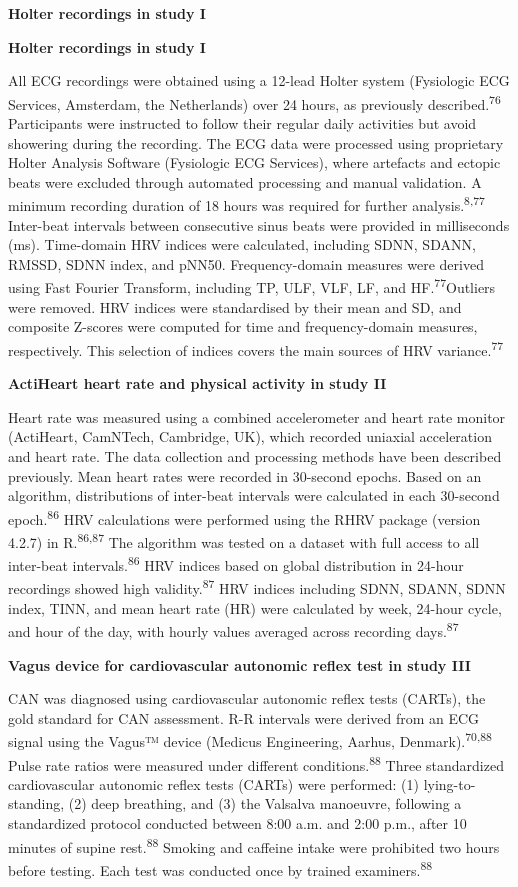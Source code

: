 \documentclass[
  letterpaper,
  headsepline=true,
  open=any]{scrbook}
\begin{document}
\textbf{Holter recordings in study I}

\textbf{Holter recordings in study I}

All ECG recordings were obtained using a 12-lead Holter system
(Fysiologic ECG Services, Amsterdam, the Netherlands) over 24 hours, as
previously described.\textsuperscript{76} Participants were instructed
to follow their regular daily activities but avoid showering during the
recording. The ECG data were processed using proprietary Holter Analysis
Software (Fysiologic ECG Services), where artefacts and ectopic beats
were excluded through automated processing and manual validation. A
minimum recording duration of 18 hours was required for further
analysis.\textsuperscript{8,77} Inter-beat intervals between consecutive
sinus beats were provided in milliseconds (ms). Time-domain HRV indices
were calculated, including SDNN, SDANN, RMSSD, SDNN index, and pNN50.
Frequency-domain measures were derived using Fast Fourier Transform,
including TP, ULF, VLF, LF, and HF.\textsuperscript{77}Outliers were
removed. HRV indices were standardised by their mean and SD, and
composite Z-scores were computed for time and frequency-domain measures,
respectively. This selection of indices covers the main sources of HRV
variance.\textsuperscript{77}

\textbf{ActiHeart heart rate and physical activity in study II}

Heart rate was measured using a combined accelerometer and heart rate
monitor (ActiHeart, CamNTech, Cambridge, UK), which recorded uniaxial
acceleration and heart rate. The data collection and processing methods
have been described previously. Mean heart rates were recorded in
30-second epochs. Based on an algorithm, distributions of inter-beat
intervals were calculated in each 30-second epoch.\textsuperscript{86}
HRV calculations were performed using the RHRV package (version 4.2.7)
in R.\textsuperscript{86,87} The algorithm was tested on a dataset with
full access to all inter-beat intervals.\textsuperscript{86} HRV indices
based on global distribution in 24-hour recordings showed high
validity.\textsuperscript{87} HRV indices including SDNN, SDANN, SDNN
index, TINN, and mean heart rate (HR) were calculated by week, 24-hour
cycle, and hour of the day, with hourly values averaged across recording
days.\textsuperscript{87}

\textbf{Vagus device for cardiovascular autonomic reflex test in study
III}

CAN was diagnosed using cardiovascular autonomic reflex tests (CARTs),
the gold standard for CAN assessment. R-R intervals were derived from an
ECG signal using the Vagus™ device (Medicus Engineering, Aarhus,
Denmark).\textsuperscript{70,88} Pulse rate ratios were measured under
different conditions.\textsuperscript{88} Three standardized
cardiovascular autonomic reflex tests (CARTs) were performed: (1)
lying-to-standing, (2) deep breathing, and (3) the Valsalva manoeuvre,
following a standardized protocol conducted between 8:00 a.m. and 2:00
p.m., after 10 minutes of supine rest.\textsuperscript{88} Smoking and
caffeine intake were prohibited two hours before testing. Each test was
conducted once by trained examiners.\textsuperscript{88}
\end{document}
